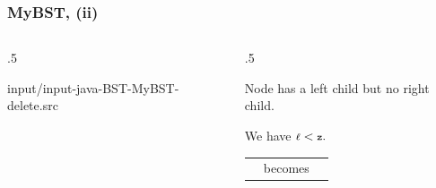 \documentclass[10pt]{beamer}
\begin{document}
\begin{frame}[t]\frametitle{MyBST,  (ii)}
	\vspace{-0.3cm}
	\begin{columns}[T] %
	\begin{column}{.5\linewidth} %
		{\tiny 
			
				{input/input-java-BST-MyBST-delete.src}
		} %
\	\end{column} %
	\begin{column}{.5\linewidth} %
		{\tiny 
		\begin{example}
		Node  has a left child \hCode{$\ell$}  
		but no right child.
		
		We have $ \hCode{$\ell$} < \hCode{z}.$
		\begin{center}
			\begin{tabular}{c c c}
				\adjustbox{valign=t}{			
					
				} %
				& becomes
				&
				\adjustbox{valign=t}{	
					
				} %
			\end{tabular}
		\end{center}
		\end{example}
		} %
	\end{column} %
	\end{columns} %

\end{frame}
\end{document}
